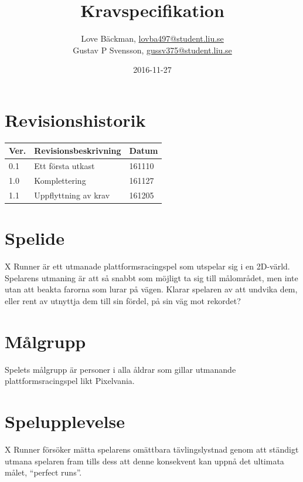 \documentclass{TDP003mall}
\author{Love Bäckman, \url{lovba497@student.liu.se} \\
  Gustav P Svensson, \url{gussv375@student.liu.se}}
\title{Kravspecifikation}
\date{2016-11-27}
\begin{document}
\projectpage

\tableofcontents
\newpage

\section{Revisionshistorik}
\begin{table}[!h]
\begin{tabularx}{\linewidth}{|l|X|l|}
\hline
Ver. & Revisionsbeskrivning & Datum \\\hline
0.1 & Ett första utkast & 161110 \\\hline
1.0 & Komplettering & 161127 \\\hline
1.1 & Uppflyttning av krav & 161205 \\\hline
\end{tabularx}
\end{table}


\section{Spelide}
X Runner är ett utmanade plattformsracingspel som utspelar sig i en 2D-värld.
Spelarens utmaning är att så snabbt som möjligt ta sig till målområdet, men inte utan att beakta farorna som lurar på vägen. Klarar spelaren av att undvika dem, eller rent av utnyttja dem till sin fördel, på sin väg mot rekordet?

\section{Målgrupp}
Spelets målgrupp är personer i alla åldrar som gillar utmanande plattformsracingspel likt Pixelvania.

\section{Spelupplevelse}
X Runner försöker mätta spelarens omättbara tävlingslystnad genom att ständigt utmana spelaren fram tills dess att denne konsekvent kan uppnå det ultimata målet, ``perfect runs''.
\end{document}
